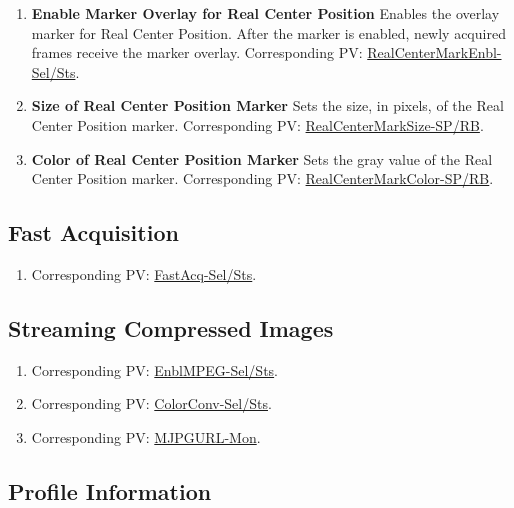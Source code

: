 \documentclass[openany]{article}
\begin{document}
\begin{enumerate}
            \item \textbf{Enable Marker Overlay for Real Center Position} Enables the overlay marker for Real Center Position. After the marker is enabled, newly acquired frames receive the marker overlay. Corresponding PV: \hyperlink{pv:real-center-mark-enbl}{RealCenterMarkEnbl-Sel/Sts}.
            \item \textbf{Size of Real Center Position Marker} Sets the size, in pixels, of the Real Center Position marker. Corresponding PV: \hyperlink{pv:real-center-mark-size}{RealCenterMarkSize-SP/RB}.
            \item \textbf{Color of Real Center Position Marker} Sets the gray value of the Real Center Position marker. Corresponding PV: \hyperlink{pv:real-center-mark-color}{RealCenterMarkColor-SP/RB}.
        \end{enumerate}

    \subsection{Fast Acquisition}\label{sec:fast-acq}

        \begin{enumerate}
            \item \textbf{} Corresponding PV: \hyperlink{pv:fast-acq}{FastAcq-Sel/Sts}.
        \end{enumerate}

    \subsection{Streaming Compressed Images}\label{sec:compressed-img}

        \begin{enumerate}
            \item \textbf{} Corresponding PV: \hyperlink{pv:enbl-mpeg}{EnblMPEG-Sel/Sts}.
            \item \textbf{} Corresponding PV: \hyperlink{pv:color-conv}{ColorConv-Sel/Sts}.
            \item \textbf{} Corresponding PV: \hyperlink{pv:mjpg-url}{MJPGURL-Mon}.
        \end{enumerate}

    \subsection{Profile Information}\label{sec:profile-info}
\end{document}
